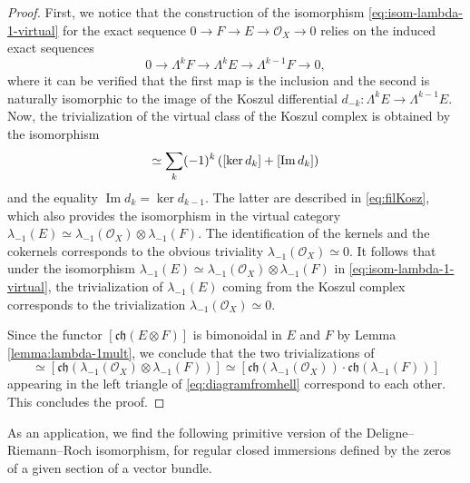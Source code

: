 \documentclass[11pt]{article}
\theoremstyle{plain}
\theoremstyle{definition}
\newcommand{\Ocal}{\mathcal O}
\newcommand{\chfrak}{\mathfrak {ch}}
\DeclareMathOperator{\Imag}{Im}
\begin{document}
\begin{proof}
First, we notice that the construction of the isomorphism \eqref{eq:isom-lambda-1-virtual} for the exact sequence $0\to F\to E\to\Ocal_{X}\to 0$ relies on the induced exact sequences\vspace*{-3pt}
\begin{equation}\label{eq:filKosz}
0\to\Lambda^{k}F\to \Lambda^{k}E\to\Lambda^{k-1}F\to 0,
\end{equation}
where it can be verified that the first map is the inclusion and the second is naturally isomorphic to the image of the Koszul differential $d_{-k}\colon\Lambda^{k}E\to\Lambda^{k-1}E$. Now, the trivialization of the virtual class of the Koszul complex is obtained by the isomorphism\vspace*{-3pt}
\begin{displaymath}
[K(\sigma)]\simeq \sum_{k}(-1)^{k} \left([\ker d_{k}]+ [\Imag d_{k}]\right)\vspace*{-3pt}
\end{displaymath}
and the equality $\Imag d_{k} = \ker d_{k-1}$. The latter are described in \eqref{eq:filKosz}, which also provides the isomorphism in the virtual category $\lambda_{-1}(E) \simeq \lambda_{-1}(\Ocal_X) \otimes \lambda_{-1}(F)$. The identification of the kernels and the cokernels corresponds to the obvious triviality $\lambda_{-1}(\Ocal_X) \simeq 0$. It follows that under the isomorphism $\lambda_{-1}(E)\simeq \lambda_{-1}(\Ocal_X) \otimes \lambda_{-1}(F)$ in
\eqref{eq:isom-lambda-1-virtual}, the trivialization of $\lambda_{-1}(E)$ coming from the Koszul complex corresponds to the trivialization $\lambda_{-1}(\Ocal_X)\simeq 0$.

Since the functor $[\chfrak(E \otimes F)]$ is bimonoidal in $E$ and $F$ by Lemma \ref{lemma:lambda-1mult}, we conclude that the two trivializations of\vspace*{-3pt}\enlargethispage{.5\baselineskip}
\begin{displaymath}
[\chfrak(\lambda_{-1}(E))] \simeq [\chfrak(\lambda_{-1}(\Ocal_X) \otimes \lambda_{-1}(F))] \simeq [\chfrak(\lambda_{-1}(\Ocal_X)) \cdot \chfrak(\lambda_{-1}(F))]
\end{displaymath}
appearing in the left triangle of \eqref{eq:diagramfromhell} correspond to each other. This concludes the proof.
\end{proof}

As an application, we find the following primitive version of the Deligne--Riemann--Roch isomorphism, for regular closed immersions defined by the zeros of a given section of a vector bundle.
\end{document}
